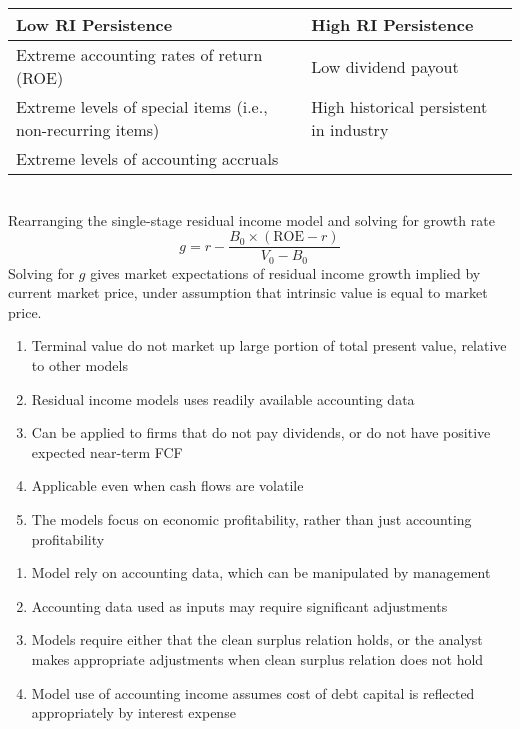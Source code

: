 \begin{flushleft}
\begin{tabularx}{\textwidth}{p{25em}|X}
\hline
\rowcolor{gray!30}
Low RI Persistence & High RI Persistence \\
\hline
Extreme accounting rates of return (ROE) & Low dividend payout \\
\hline
Extreme levels of special items (i.e., non-recurring items) & High historical persistent in industry \\
\hline
Extreme levels of accounting accruals & \\
\hline
\end{tabularx}
\end{flushleft}

\begin{method} \\
Rearranging the single-stage residual income model and solving for growth rate
\begin{equation}
g = r - \frac{B_0 \times (\text{ROE} - r)}{V_0 - B_0} \nonumber
\end{equation}
Solving for $g$ gives market expectations of residual income growth implied by current market price, under assumption that intrinsic value is equal to market price.
\end{method}

\begin{remark} 
\begin{enumerate}[label=\roman*.]
\setlength{\itemsep}{0pt}
\item Terminal value do not market up large portion of total present value, relative to other models
\item Residual income models uses readily available accounting data
\item Can be applied to firms that do not pay dividends, or do not have positive expected near-term FCF
\item Applicable even when cash flows are volatile
\item The models focus on economic profitability, rather than just accounting profitability
\end{enumerate}
\end{remark}

\begin{remark} 
\begin{enumerate}[label=\roman*.]
\setlength{\itemsep}{0pt}
\item Model rely on accounting data, which can be manipulated by management
\item Accounting data used as inputs may require significant adjustments
\item Models require either that the clean surplus relation holds, or the analyst makes appropriate adjustments when clean surplus relation does not hold
\item Model use of accounting income assumes cost of debt capital is reflected appropriately by interest expense
\end{enumerate}
\end{remark}

